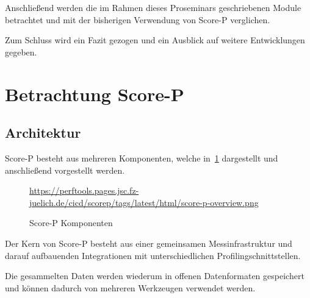 \documentclass[german,proseminar,hyperref,utf8,lof]{zihpub}
\begin{document}
    Anschlie{\ss}end werden die im Rahmen dieses Proseminars geschriebenen Module betrachtet
    und mit der bisherigen Verwendung von Score-P verglichen.

    Zum Schluss wird ein Fazit gezogen und ein Ausblick auf weitere Entwicklungen gegeben.

    \newpage
    \section{Betrachtung Score-P}
    \subsection{Architektur}
    Score-P besteht aus mehreren Komponenten, welche in~\ref{fig:score-p-overview} dargestellt
    und anschlie{\ss}end vorgestellt werden.

    \begin{figure}[ht]
        \begin{center}
                {\tiny \url{https://perftools.pages.jsc.fz-juelich.de/cicd/scorep/tags/latest/html/score-p-overview.png}}
            \caption{Score-P Komponenten}
            \label{fig:score-p-overview}
        \end{center}
    \end{figure}

    Der Kern von Score-P besteht aus einer gemeinsamen Messinfrastruktur und darauf aufbauenden
    Integrationen mit unterschiedlichen Profilingschnittstellen.

    Die gesammelten Daten werden wiederum in offenen Datenformaten gespeichert und können
    dadurch von mehreren Werkzeugen verwendet werden.
\end{document}
